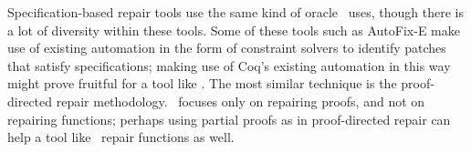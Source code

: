 

Specification-based repair tools use
the same kind of oracle \sysname\ uses,
though there is a lot of diversity
within these tools. %
Some of these tools such as AutoFix-E make
use of existing automation in the form of constraint
solvers to identify patches that satisfy specifications;
making use of Coq's existing automation
in this way might prove fruitful for a tool like \sysname.
The most similar technique is the proof-directed repair methodology. 
\sysname\ focuses
only on repairing proofs, and not
on repairing functions; perhaps using partial 
proofs as in proof-directed repair
can help a tool like \sysname\
repair functions as well.

